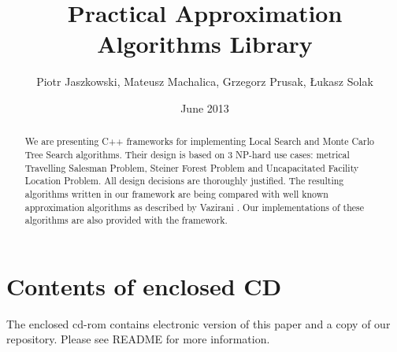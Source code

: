 \documentclass[licencjacka]{pracamgr}
\author{Piotr Jaszkowski, Mateusz Machalica, Grzegorz Prusak, Łukasz Solak}
\title{Practical Approximation Algorithms Library}
\date{June 2013}
\begin{document}
\maketitle

\begin{abstract}
  We are presenting C++ frameworks for implementing Local Search
  and Monte Carlo Tree Search algorithms. Their design is based
  on 3 NP-hard use cases: metrical Travelling Salesman Problem,
  Steiner Forest Problem and Uncapacitated Facility Location Problem.
  All design decisions are thoroughly justified. The resulting
  algorithms written in our framework are being compared with
  well known approximation algorithms as described by Vazirani \cite{Vazirani}.
  Our implementations of these algorithms are also provided with the framework.
\end{abstract}

\tableofcontents

\newpage
\chapter*{Contents of enclosed CD}
The enclosed cd-rom contains electronic version of this paper and a copy of our repository.
Please see README for more information.

\newpage
\end{document}
